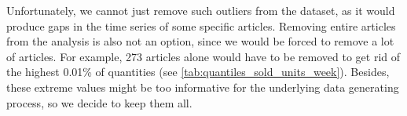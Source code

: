 Unfortunately, we cannot just remove such outliers from the dataset, as it would produce gaps in the time series of some specific articles. Removing entire articles from the analysis is also not an option, since we would be forced to remove a lot of articles. For example, 273 articles alone would have to be removed to get rid of the highest 0.01\% of quantities (see \autoref{tab:quantiles_sold_units_week}). Besides, these extreme values might be too informative for the underlying data generating process, so we decide to keep them all.








